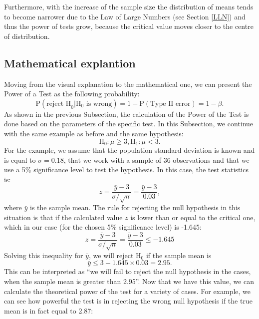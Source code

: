 \documentclass[
]{book}
\theoremstyle{definition}
\theoremstyle{definition}
\theoremstyle{definition}
\theoremstyle{definition}
\theoremstyle{remark}
\begin{document}
Furthermore, with the increase of the sample size the distribution of means tends to become narrower due to the Law of Large Numbers (see Section \ref{LLN}) and thus the power of tests grow, because the critical value moves closer to the centre of distribution.

\hypertarget{PowerMathematical}{%
\subsection{Mathematical explantion}\label{PowerMathematical}}

Moving from the visual explanation to the mathematical one, we can present the Power of a Test as the following probability:
\begin{equation}
    \mathrm{P}(\text{reject H}_0 | \mathrm{H}_0 \text{ is wrong}) = 1 - \mathrm{P}(\text{Type II error}) = 1-\beta.
    \label{eq:powerOfATestConcept}
\end{equation}
As shown in the previous Subsection, the calculation of the Power of the Test is done based on the parameters of the specific test. In this Subsection, we continue with the same example as before and the same hypothesis:
\begin{equation*}
    \mathrm{H}_0: \mu \geq 3, \mathrm{H}_1: \mu < 3.
\end{equation*}
For the example, we assume that the population standard deviation is known and is equal to \(\sigma=0.18\), that we work with a sample of 36 observations and that we use a 5\% significance level to test the hypothesis. In this case, the test statistics is:
\begin{equation}
    z = \frac{\bar{y}-3}{\sigma/\sqrt{n}} = \frac{\bar{y}-3}{0.03} ,
    \label{eq:powerOfATest01}
\end{equation}
where \(\bar{y}\) is the sample mean. The rule for rejecting the null hypothesis in this situation is that if the calculated value \(z\) is lower than or equal to the critical one, which in our case (for the chosen 5\% significance level) is -1.645:
\begin{equation*}
    z = \frac{\bar{y}-3}{\sigma/\sqrt{n}} = \frac{\bar{y}-3}{0.03} \leq -1.645
\end{equation*}
Solving this inequality for \(\bar{y}\), we will reject H\(_0\) if the sample mean is
\begin{equation}
    \bar{y} \leq 3 -1.645 \times 0.03 = 2.95 .
    \label{eq:powerOfATest02}
\end{equation}
This can be interpreted as ``we will fail to reject the null hypothesis in the cases, when the sample mean is greater than 2.95''. Now that we have this value, we can calculate the theoretical power of the test for a variety of cases. For example, we can see how powerful the test is in rejecting the wrong null hypothesis if the true mean is in fact equal to 2.87:
\end{document}
